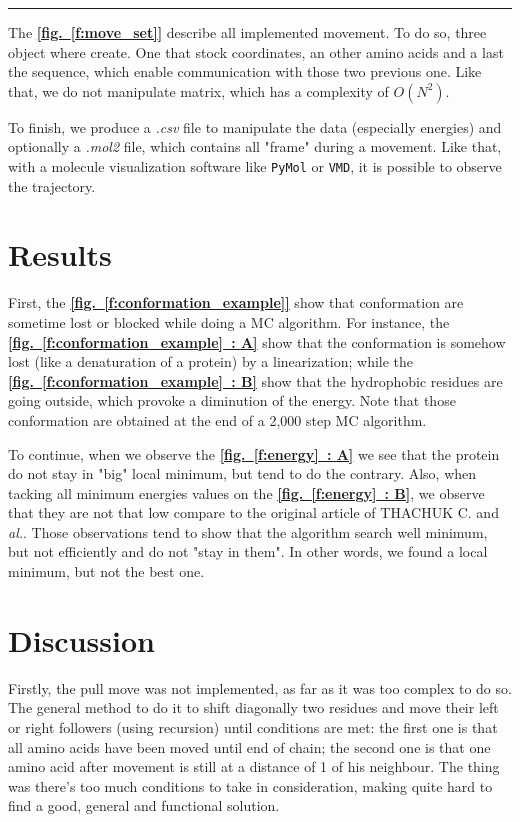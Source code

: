 \documentclass[12pt, oneside, a4paper]{report}
\newcommand{\fref}[1]{\hyperref[#1]{\textbf{[fig.~\ref*{#1}]}}}
\newcommand{\subfref}[2]{\hyperref[#1]{\textbf{[fig.~\ref*{#1}~: #2]}}}
\begin{document}
\begin{multicols}{2}
\begin{minipage}{\columnwidth}
    \small
    \vspace{0.5ex}
    \hrule height 1pt

\end{minipage}

The \fref{f:move_set} describe all implemented movement. To do so, three object where create. One that stock coordinates, an other amino acids and a last the sequence, which enable communication with those two previous one. Like that, we do not manipulate matrix, which has a complexity of $O(N^2)$.

To finish, we produce a \textit{.csv} file to manipulate the data (especially energies) and optionally a \textit{.mol2} file, which contains all "frame" during a movement. Like that, with a molecule visualization software like \texttt{PyMol} or \texttt{VMD}, it is possible to observe the trajectory.

\section{Results}
First, the \fref{f:conformation_example} show that conformation are sometime lost or blocked while doing a MC algorithm. For instance, the \subfref{f:conformation_example}{A} show that the conformation is somehow lost (like a denaturation of a protein) by a linearization; while the \subfref{f:conformation_example}{B} show that the hydrophobic residues are going outside, which provoke a diminution of the energy. Note that those conformation are obtained at the end of a 2,000 step MC algorithm.

To continue, when we observe the \subfref{f:energy}{A} we see that the protein do not stay in "big" local minimum, but tend to do the contrary. Also, when tacking all minimum energies values on the  \subfref{f:energy}{B}, we observe that they are not that low compare to the original article of THACHUK C. and \textit{al.}. Those observations tend to show that the algorithm search well minimum, but not efficiently and do not "stay in them". In other words, we found a local minimum, but not the best one.

\section{Discussion}
Firstly, the pull move was not implemented, as far as it was too complex to do so. The general method to do it to shift diagonally two residues and move their left or right followers (using recursion) until conditions are met: the first one is that all amino acids have been moved until end of chain; the second one is that one amino acid after movement is still at a distance of 1 of his neighbour. The thing was there's too much conditions to take in consideration, making quite hard to find a good, general and functional solution.


\end{multicols}
\end{document}
